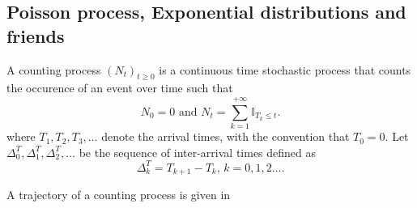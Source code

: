 \subsection{Poisson process, Exponential distributions and friends}\label{sssec:exp_distribution}
\begin{definition}\label{def:counting_process}
A counting process $(N_t)_{t\geq0}$ is a continuous time stochastic process that counts the occurence of an event over time such that
\begin{equation*}
N_0=0\text{ and }N_t=\sum_{k=1}^{+\infty}\mathbb{I}_{T_k\leq t}.
\end{equation*}
where $T_1,T_2,T_3,\ldots$ denote the arrival times, with the convention that $T_0=0$. Let $\Delta^T_0,\Delta^T_1,\Delta^T_2,\ldots$ be the sequence of inter-arrival times defined as
$$
\Delta^T_k=T_{k+1}-T_{k}\text{, }k=0,1,2\ldots.
$$
\end{definition}
A trajectory of a counting process is given in 
